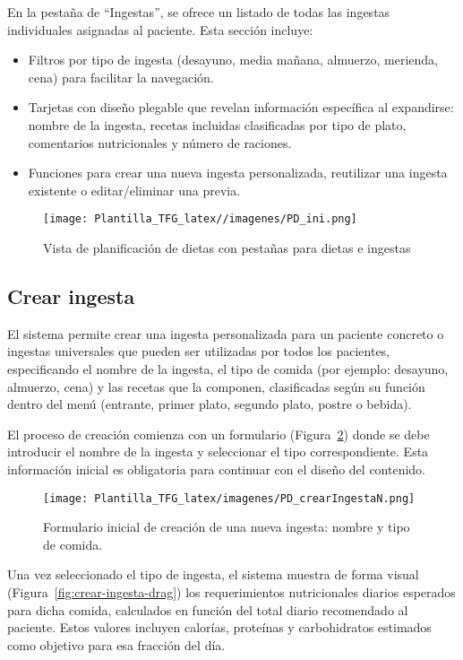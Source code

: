 En la pestaña de ``Ingestas'', se ofrece un listado de todas las ingestas individuales asignadas al paciente. Esta sección incluye:
\begin{itemize}
    \item Filtros por tipo de ingesta (desayuno, media mañana, almuerzo, merienda, cena) para facilitar la navegación.
    \item Tarjetas con diseño plegable que revelan información específica al expandirse: nombre de la ingesta, recetas incluidas clasificadas por tipo de plato, comentarios nutricionales y número de raciones.
    \item Funciones para crear una nueva ingesta personalizada, reutilizar una ingesta existente o editar/eliminar una previa.
\end{itemize}

\begin{figure}[H]
    \centering
    \texttt{[image: Plantilla\_TFG\_latex//imagenes/PD\_ini.png]}
    \caption{Vista de planificación de dietas con pestañas para dietas e ingestas}
    \label{fig:PD_ini}
\end{figure}

\subsection{Crear ingesta}
El sistema permite crear una ingesta personalizada para un paciente concreto o ingestas universales que pueden ser utilizadas por todos los pacientes, especificando el nombre de la ingesta, el tipo de comida (por ejemplo: desayuno, almuerzo, cena) y las recetas que la componen, clasificadas según su función dentro del menú (entrante, primer plato, segundo plato, postre o bebida).

El proceso de creación comienza con un formulario (Figura~\ref{fig:crear-ingesta-form}) donde se debe introducir el nombre de la ingesta y seleccionar el tipo correspondiente. Esta información inicial es obligatoria para continuar con el diseño del contenido.

\begin{figure}[t]
    \centering
    \texttt{[image: Plantilla\_TFG\_latex/imagenes/PD\_crearIngestaN.png]}
    \caption{Formulario inicial de creación de una nueva ingesta: nombre y tipo de comida.}
    \label{fig:crear-ingesta-form}
\end{figure}

Una vez seleccionado el tipo de ingesta, el sistema muestra de forma visual (Figura~\ref{fig:crear-ingesta-drag}) los requerimientos nutricionales diarios esperados para dicha comida, calculados en función del total diario recomendado al paciente. Estos valores incluyen calorías, proteínas y carbohidratos estimados como objetivo para esa fracción del día.

